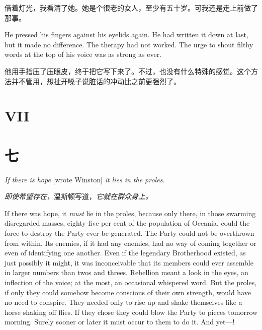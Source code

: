 \begin{paracol}{2}
\switchcolumn

借着灯光，我看清了她。她是个很老的女人，至少有五十岁。可我还是走上前做了那事。

\switchcolumn*

He pressed his fingers against his eyelids again. He had written it down
at last, but it made no difference. The therapy had not worked. The urge
to shout filthy words at the top of his voice was as strong as ever.

\switchcolumn

他用手指压了压眼皮，终于把它写下来了。不过，也没有什么特殊的感觉。这个方法并不管用，想扯开嗓子说脏话的冲动比之前更强烈了。

\switchcolumn*


\section{VII}\label{vii}

\switchcolumn

\section*{七}\label{ux4e03}

\switchcolumn*

\emph{If there is hope} [wrote Winston] \emph{it lies in the proles}.

\switchcolumn

\emph{即使希望存在，}温斯顿写道，\emph{它就在群众身上。}

\switchcolumn*

\sectionbreak

\switchcolumn

\sectionbreak

\switchcolumn*

If there was hope, it \emph{must} lie in the proles, because only there,
in those swarming disregarded masses, eighty-five per cent of the
population of Oceania, could the force to destroy the Party ever be
generated. The Party could not be overthrown from within. Its enemies,
if it had any enemies, had no way of coming together or even of
identifying one another. Even if the legendary Brotherhood existed, as
just possibly it might, it was inconceivable that its members could ever
assemble in larger numbers than twos and threes. Rebellion meant a look
in the eyes, an inflection of the voice; at the most, an occasional
whispered word. But the proles, if only they could somehow become
conscious of their own strength, would have no need to conspire. They
needed only to rise up and shake themselves like a horse shaking off
flies. If they chose they could blow the Party to pieces tomorrow
morning. Surely sooner or later it must occur to them to do it. And
yet---!


\end{paracol}
